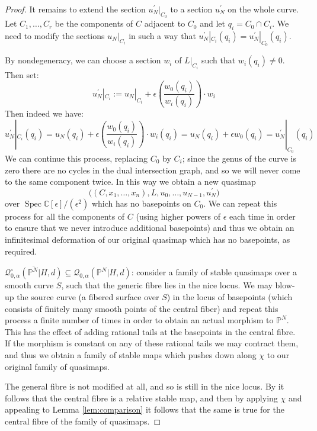 \documentclass[11pt]{amsart}
\newcommand{\Q}[4]{\mathcal{Q}_{#1,#2}(#3,#4)}
\newcommand{\PP}{\mathbb P}
\newcommand{\Spec}{\operatorname{Spec}}
\newcommand{\CC}{\mathbb{C}}
\theoremstyle{definition}
\theoremstyle{definition}
\begin{document}
\begin{proof}
It remains to extend the section $u_N^\prime|_{C_0}$ to a section $u_N^\prime$ on the whole curve. Let $C_1, \ldots, C_r$ be the components of $C$ adjacent to $C_0$ and let $q_i = C_0 \cap C_i$. We need to modify the sections $u_N|_{C_i}$ in such a way that $u_N^\prime|_{C_i}(q_i) = u_N^\prime|_{C_0}(q_i)$.

By nondegeneracy, we can choose a section $w_i$ of $L|_{C_i}$ such that $w_i(q_i) \neq 0$. Then set:
\begin{equation*} {u_N^\prime}|_{C_i} := {u_N}|_{C_i} + \epsilon \left( \frac{w_0(q_i)}{w_i(q_i)} \right) \cdot w_i \end{equation*}
Then indeed we have:
\begin{equation*} {u_N^\prime}|_{C_i}(q_i) = u_N(q_i) + \epsilon \left( \frac{w_0(q_i)}{w_i(q_i)} \right) \cdot w_i(q_i) = u_N(q_i) + \epsilon w_0(q_i) = {u_N^\prime}|_{C_0}(q_i) \end{equation*}
We can continue this process, replacing $C_0$ by $C_i$; since the genus of the curve is zero there are no cycles in the dual intersection graph, and so we will never come to the same component twice. In this way we obtain a new quasimap
\begin{equation*} \big((C,x_1,\ldots,x_n),L,u_0, \ldots, u_{N-1}, u_N^\prime\big) \end{equation*}
over $\Spec \CC[\epsilon]/(\epsilon^2)$ which has no basepoints on $C_0$. We can repeat this process for all the components of $C$ (using higher powers of $\epsilon$ each time in order to ensure that we never introduce additional basepoints) and thus we obtain an infinitesimal deformation of our original quasimap which has no basepoints, as required.

$\overline{\mathcal{Q}^{\circ}_{0,\alpha}(\PP^N|H,d)}\subseteq\Q{0}{\alpha}{\PP^N|H}{d}$: consider a family of stable quasimaps over a smooth curve $S$, such that the generic fibre lies in the nice locus. We may  blow-up the source curve (a fibered surface over $S$) in the locus of basepoints (which consists of finitely many smooth points of the central fiber) and repeat this process a finite number of times in order to obtain an actual morphism to $\PP^N$. This has the effect of adding rational tails at the basepoints in the central fibre. If the morphism is constant on any of these rational tails we may contract them, and thus we obtain a family of stable maps which pushes down along $\chi$ to our original family of quasimaps.

The general fibre is not modified at all, and so is still in the nice locus. By \cite[Lemma 1.9]{Ga} it follows that the central fibre is a relative stable map, and then by applying $\chi$ and appealing to Lemma \ref{lem:comparison} it follows that the same is true for the central fibre of the family of quasimaps.
\end{proof}
\end{document}
